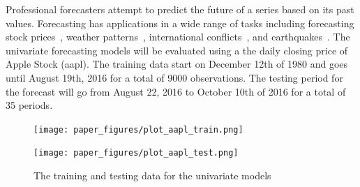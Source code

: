 \documentclass[12pt]{article}%
\theoremstyle{definition}
\begin{document}
Professional forecasters attempt to predict the future of a series based on its past values. Forecasting has applications in a wide range of tasks including forecasting stock prices~\cite{GRANGER19923}, weather patterns~\cite{MurphymeteoForecast}, international conflicts~\cite{Chadefaux01012014}, and earthquakes~\cite{earthquakeYegu}. The univariate forecasting models will be evaluated using a the daily closing price of Apple Stock (aapl). The training data start on December 12th of 1980 and goes until August 19th, 2016 for a total of 9000 observations. The testing period for the forecast will go from August 22, 2016 to October 10th of 2016 for a total of 35 periods.

\singlespacing

\begin{knitrout}
\color{fgcolor}\begin{kframe}


{\ttfamily\noindent\bfseries{}}\end{kframe}
\end{knitrout}

\begin{knitrout}
\color{fgcolor}\begin{kframe}
\begin{alltt}
 \hlkwb{<-} \hlstd{(}\hlstd{)}
 \hlkwb{<-} \hlopt{$}  \hlstd{=} \hlopt{$}
 \hlkwb{<-} 
 \hlkwb{<-} \hlstd{aaplXts[}\hlopt{:}\hlstd{,]}
  \hlkwb{<-} \hlstd{aaplXts[}\hlopt{:}\hlstd{,]}
\end{alltt}
\end{kframe}
\end{knitrout}



\begin{figure}[h!]
\centering
\begin{minipage}{.5\textwidth}
  \centering
  \texttt{[image: paper\_figures/plot\_aapl\_train.png]}
  \label{fig:aapl_train}
\end{minipage}%
\begin{minipage}{.5\textwidth}
  \centering
  \texttt{[image: paper\_figures/plot\_aapl\_test.png]}
  \label{fig:aapl_test}
\end{minipage}
\caption{The training and testing data for the univariate models}
\end{figure}
\end{document}
